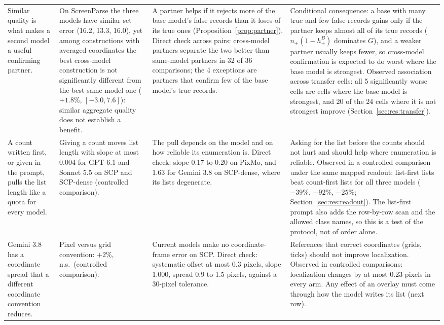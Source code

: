 \begin{table}[tp]
\begin{tabular}{@{}>{\raggedright\arraybackslash}p{3.1cm}>{\raggedright\arraybackslash}p{3.4cm}>{\raggedright\arraybackslash}p{4.0cm}>{\raggedright\arraybackslash}p{4.5cm}@{}}
Similar quality is what makes a second model a useful confirming partner. & On ScreenParse the three models have similar set error (16.2, 13.3, 16.0), yet among constructions with averaged coordinates the best cross-model construction is not significantly different from the best same-model one ($+1.8\%$, $[-3.0,7.6]$): similar aggregate quality does not establish a benefit. & A partner helps if it rejects more of the base model's false records than it loses of its true ones (Proposition~\ref{prop:partner}). Direct check across pairs: cross-model partners separate the two better than same-model partners in 32 of 36 comparisons; the 4 exceptions are partners that confirm few of the base model's true records. & Conditional consequence: a base with many true and few false records gains only if the partner keeps almost all of its true records ($n_+(1-h_+^B)$ dominates $G$), and a weaker partner usually keeps fewer, so cross-model confirmation is expected to do worst where the base model is strongest. Observed association across transfer cells: all 5 significantly worse cells are cells where the base model is strongest, and 20 of the 24 cells where it is not strongest improve (Section~\ref{sec:res:transfer}). \\
A count written first, or given in the prompt, pulls the list length like a quota for every model. & Giving a count moves list length with slope at most 0.004 for GPT-6.1 and Sonnet 5.5 on SCP and SCP-dense (controlled comparison). & The pull depends on the model and on how reliable its enumeration is. Direct check: slope 0.17 to 0.20 on PixMo, and 1.63 for Gemini 3.8 on SCP-dense, where its lists degenerate. & Asking for the list before the counts should not hurt and should help where enumeration is reliable. Observed in a controlled comparison under the same mapped readout: list-first lists beat count-first lists for all three models ($-39\%$, $-92\%$, $-25\%$; Section~\ref{sec:res:readout}). The list-first prompt also adds the row-by-row scan and the allowed class names, so this is a test of the protocol, not of order alone. \\
Gemini 3.8 has a coordinate spread that a different coordinate convention reduces. & Pixel versus grid convention: $+2\%$, n.s.\ (controlled comparison). & Current models make no coordinate-frame error on SCP. Direct check: systematic offset at most 0.3 pixels, slope 1.000, spread 0.9 to 1.5 pixels, against a 30-pixel tolerance. & References that correct coordinates (grids, ticks) should not improve localization. Observed in controlled comparisons: localization changes by at most 0.23 pixels in every arm. Any effect of an overlay must come through how the model writes its list (next row). \\

\end{tabular}
\end{table}
